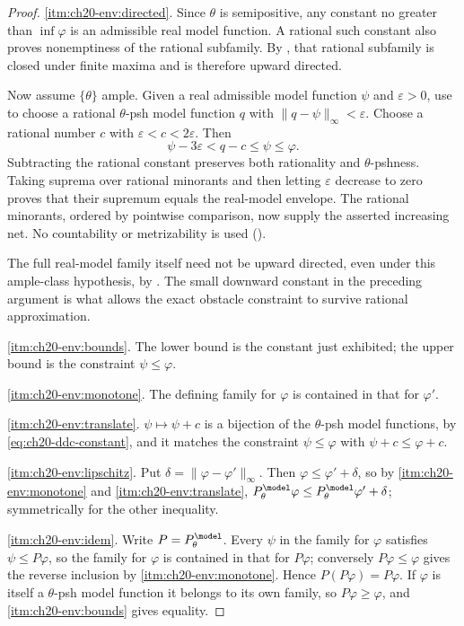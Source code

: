 \begin{proof}
\cref{itm:ch20-env:directed}.  Since \(\theta\) is semipositive, any
constant no greater than \(\inf\varphi\) is an admissible real model
function.  A rational such constant also proves nonemptiness of the
rational subfamily.  By , that rational
subfamily is closed under finite maxima and is therefore upward directed.

Now assume \(\{\theta\}\) ample.  Given a real admissible model function
\(\psi\) and \(\varepsilon>0\), use
 to choose a rational
\(\theta\)-psh model function \(q\) with
\(\|q-\psi\|_\infty<\varepsilon\).  Choose a rational number
\(c\) with \(\varepsilon<c<2\varepsilon\).  Then
\[
             \psi-3\varepsilon<q-c\leq\psi\leq\varphi.
\]
Subtracting the rational constant preserves both rationality and
\(\theta\)-pshness.  Taking suprema over rational minorants and then
letting \(\varepsilon\) decrease to zero proves that their supremum
equals the real-model envelope.  The rational minorants, ordered by
pointwise comparison, now supply the asserted increasing net.  No
countability or metrizability is used ().

The full real-model family itself need not be upward directed, even
under this ample-class hypothesis, by
.  The small downward
constant in the preceding argument is what allows the exact obstacle
constraint to survive rational approximation.

\cref{itm:ch20-env:bounds}.  The lower bound is the constant just exhibited;
the upper bound is the constraint \(\psi\leq\varphi\).

\cref{itm:ch20-env:monotone}.  The defining family for \(\varphi\) is
contained in that for \(\varphi'\).

\cref{itm:ch20-env:translate}.  \(\psi\mapsto\psi+c\) is a bijection of the
\(\theta\)-psh model functions, by \eqref{eq:ch20-ddc-constant}, and it
matches the constraint \(\psi\leq\varphi\) with \(\psi+c\leq\varphi+c\).

\cref{itm:ch20-env:lipschitz}.  Put \(\delta=\|\varphi-\varphi'\|_\infty\).
Then \(\varphi\leq\varphi'+\delta\), so by
\cref{itm:ch20-env:monotone} and \cref{itm:ch20-env:translate},
\(P^{\model}_\theta\varphi\leq P^{\model}_\theta\varphi'+\delta\);
symmetrically for the other inequality.

\cref{itm:ch20-env:idem}.  Write \(P=P^{\model}_\theta\).  Every \(\psi\) in
the family for \(\varphi\) satisfies \(\psi\leq P\varphi\), so the family
for \(\varphi\) is contained in that for \(P\varphi\); conversely
\(P\varphi\leq\varphi\) gives the reverse inclusion by
\cref{itm:ch20-env:monotone}.  Hence \(P(P\varphi)=P\varphi\).  If
\(\varphi\) is itself a \(\theta\)-psh model function it belongs to its own
family, so \(P\varphi\geq\varphi\), and \cref{itm:ch20-env:bounds} gives
equality.


\end{proof}
